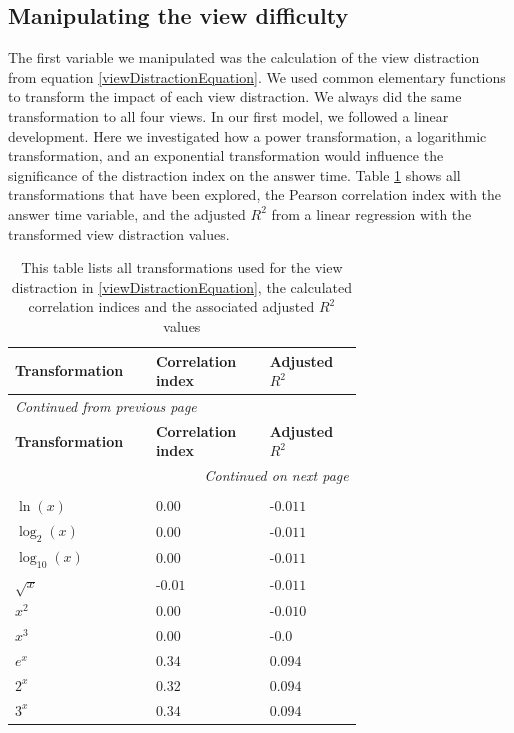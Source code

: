 \subsection{Manipulating the view difficulty}
The first variable we manipulated was the calculation of the view distraction from equation \ref{viewDistractionEquation}. We used common
elementary functions to transform the impact of each view distraction. We always did the same transformation to all four views. In our first model, we followed a
linear development. Here we investigated how a power transformation, a logarithmic transformation, and an exponential transformation would influence
the significance of the distraction index on the answer time. Table \ref{viewDistractionTransformations} shows all transformations that have
been explored, the Pearson correlation index with the answer time variable, and the adjusted $R^2$ from a linear regression with the transformed
view distraction values.

\begin{longtable}{| p{0.24\linewidth} | p{0.25\linewidth} | p{0.20\linewidth}|}
    \hline
    \textbf{Transformation} & \textbf{Correlation index} & \textbf{Adjusted $R^2$} \\
    \hline
    \endfirsthead
    \multicolumn{3}{l}{{\textit{Continued from previous page}}} \\
    \hline
    \textbf{Transformation} & \textbf{Correlation index} & \textbf{Adjusted $R^2$} \\
    \hline
    \endhead
    \hline \multicolumn{3}{r}{{\textit{Continued on next page}}} \\
    \endfoot
    \hline
    \caption{This table lists all transformations used for the view distraction in \ref{viewDistractionEquation}, the calculated correlation indices and the associated adjusted $R^2$ values \label{viewDistractionTransformations}}\\
    \endlastfoot
    $ \ln(x) $ & $0.00$ & -$0.011$ \\
    \hline
    $ \log_{2}(x) $ & $0.00$ & -$0.011$ \\
    \hline
    $ \log_{10}(x) $ & $0.00$ & -$0.011$ \\
    \hline
    $ \sqrt{x} $ & -$0.01$ & -$0.011$ \\
    \hline
    $ x^2 $ & $0.00$ & -$0.010$ \\
    \hline
    $ x^3 $ & $0.00$ & -$0.0$ \\
    \hline
    $ e^x $ & $0.34$ & $0.094$ \\
    \hline
    $ 2^x $ & $0.32$ & $0.094$ \\
    \hline
    $ 3^x $ & $0.34$ & $0.094$ \\
\end{longtable}

